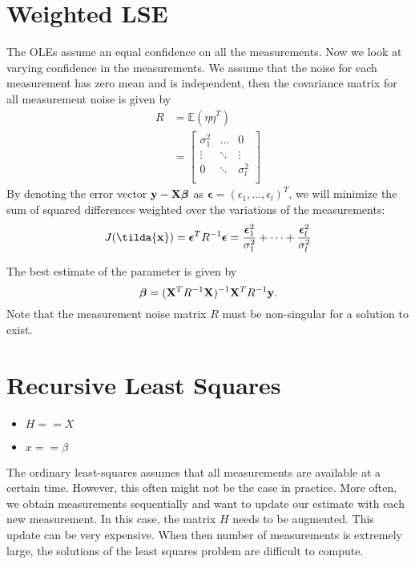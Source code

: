 \section{Weighted LSE}
The OLEs assume an equal confidence on all the measurements. Now we look at varying confidence in the measurements. We assume that the noise for each measurement has zero mean and is independent, then the covariance matrix for all measurement noise is given by
\begin{align*}
	R &= \mathbb{E}(\eta\eta^T)\\
	  &= \begin{bmatrix}
		  \sigma_1^2 & \dots & 0\\
		  \vdots & \ddots & \vdots\\
		  0 & \ddots & \sigma_l^2\\
	  \end{bmatrix}
\end{align*}
By denoting the error vector ${\mathbf{y}}-\mathbf{X}\boldsymbol{\beta}$ as $\boldsymbol{\epsilon} = (\epsilon_1, \dots, \epsilon_l)^T$, we will minimize the sum of squared differences weighted over the variations of the measurements:
$$J(\tilda{\rvx}) = \boldsymbol{\epsilon}^TR^{-1}\boldsymbol{\epsilon}=\frac{\boldsymbol{\epsilon}_1^2}{\sigma_1^2}+\dots+\frac{\boldsymbol{\epsilon}_l^2}{\sigma_l^2}$$

The best estimate of the parameter is given by
$$\boldsymbol{\beta} = (\mathbf{X}^TR^{-1}\mathbf{X})^{-1}\mathbf{X}^TR^{-1}{\mathbf{y}}.$$
Note that the measurement noise matrix $R$ must be non-singular for a solution to exist.

\section{Recursive Least Squares}
\label{sec:recursive_least_square}

\begin{itemize}
	\item $H==X$
	\item $x==\beta$
\end{itemize}

The ordinary least-squares assumes that all measurements are available at a certain time. However, this often might not be the case in practice. More often, we obtain measurements sequentially and want to update our estimate with each new measurement. In this case, the matrix $H$ needs to be augmented. This update can be very expensive. When then number of measurements is extremely large, the solutions of the least squares problem are difficult to compute. 

